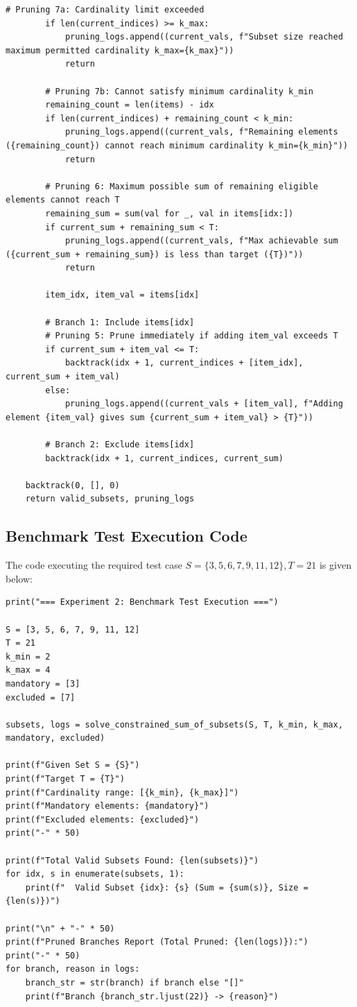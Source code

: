 \documentclass[12pt]{article}
\begin{document}
\begin{lstlisting}[style=code]
        # Pruning 7a: Cardinality limit exceeded
        if len(current_indices) >= k_max:
            pruning_logs.append((current_vals, f"Subset size reached maximum permitted cardinality k_max={k_max}"))
            return

        # Pruning 7b: Cannot satisfy minimum cardinality k_min
        remaining_count = len(items) - idx
        if len(current_indices) + remaining_count < k_min:
            pruning_logs.append((current_vals, f"Remaining elements ({remaining_count}) cannot reach minimum cardinality k_min={k_min}"))
            return

        # Pruning 6: Maximum possible sum of remaining eligible elements cannot reach T
        remaining_sum = sum(val for _, val in items[idx:])
        if current_sum + remaining_sum < T:
            pruning_logs.append((current_vals, f"Max achievable sum ({current_sum + remaining_sum}) is less than target ({T})"))
            return

        item_idx, item_val = items[idx]

        # Branch 1: Include items[idx]
        # Pruning 5: Prune immediately if adding item_val exceeds T
        if current_sum + item_val <= T:
            backtrack(idx + 1, current_indices + [item_idx], current_sum + item_val)
        else:
            pruning_logs.append((current_vals + [item_val], f"Adding element {item_val} gives sum {current_sum + item_val} > {T}"))

        # Branch 2: Exclude items[idx]
        backtrack(idx + 1, current_indices, current_sum)

    backtrack(0, [], 0)
    return valid_subsets, pruning_logs\end{lstlisting}

\subsection{Benchmark Test Execution Code}
The code executing the required test case $S = \{3, 5, 6, 7, 9, 11, 12\}, T = 21$ is given below:

\begin{lstlisting}[style=code]
print("=== Experiment 2: Benchmark Test Execution ===")

S = [3, 5, 6, 7, 9, 11, 12]
T = 21
k_min = 2
k_max = 4
mandatory = [3]
excluded = [7]

subsets, logs = solve_constrained_sum_of_subsets(S, T, k_min, k_max, mandatory, excluded)

print(f"Given Set S = {S}")
print(f"Target T = {T}")
print(f"Cardinality range: [{k_min}, {k_max}]")
print(f"Mandatory elements: {mandatory}")
print(f"Excluded elements: {excluded}")
print("-" * 50)

print(f"Total Valid Subsets Found: {len(subsets)}")
for idx, s in enumerate(subsets, 1):
    print(f"  Valid Subset {idx}: {s} (Sum = {sum(s)}, Size = {len(s)})")

print("\n" + "-" * 50)
print(f"Pruned Branches Report (Total Pruned: {len(logs)}):")
print("-" * 50)
for branch, reason in logs:
    branch_str = str(branch) if branch else "[]"
    print(f"Branch {branch_str.ljust(22)} -> {reason}")\end{lstlisting}
\end{document}
